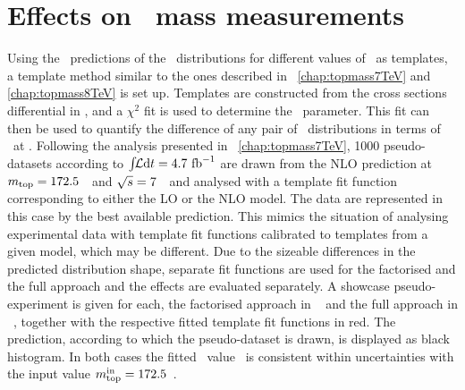 \section{Effects on \tquark\ mass measurements}
%
Using the \genlevel\ predictions of the \mlb\ distributions for different values of \mt\ as templates, a template method similar to the ones described in ~\ref{chap:topmass7TeV} and \ref{chap:topmass8TeV} is set up. 
%
Templates are constructed from the cross sections differential in \mlb, and a $\chi^2$ fit is used to determine the \mt\ parameter. This fit can then be used to quantify the difference of any pair of \mlb\ distributions in terms of \mt\ at \genlevel. 
%
Following the analysis presented in \chap~\ref{chap:topmass7TeV}, 1000 pseudo-datasets according to $\int\!\!{\mathcal L}\mathrm{d}t=4.7~\mathrm{fb}^{-1}$ are drawn from the \gls{NLO} prediction at $m_{\mathrm{top}}=172.5$~\GeV\ and ${\sqrt{s}}=7$~\TeV\ and analysed with a template fit function corresponding to either the \gls{LO} or the \gls{NLO} model. 
%
The data are represented in this case by the best available prediction. This mimics the situation of analysing experimental data with template fit functions calibrated to templates from a given model, which may be different. 
%
Due to the sizeable differences in the predicted distribution shape, separate fit functions are used for the factorised and the full approach and the effects are evaluated separately. A showcase pseudo-experiment is given for each, the factorised approach in \fig~ and the full approach in \fig~, together with the respective fitted template fit functions in red. 
%
The prediction, according to which the pseudo-dataset is drawn, is displayed as black histogram. In both cases the fitted \mt\ value \mtout\ is consistent within uncertainties with the input value $m_{\mathrm{top}}^{\mathrm{in}}=172.5$~\GeV. 
%
%

